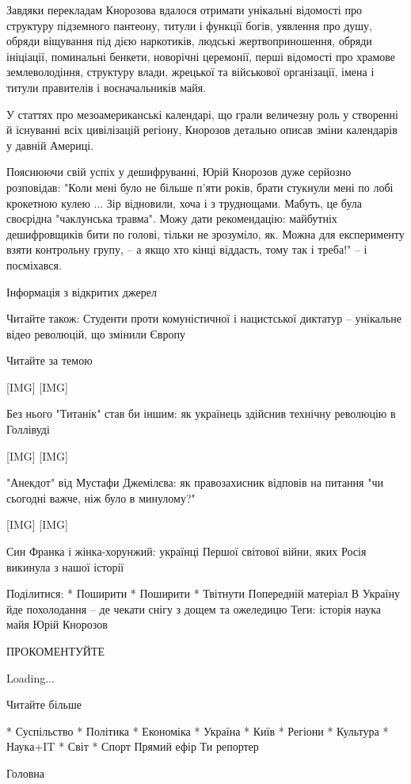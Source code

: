 Завдяки перекладам Кнорозова вдалося отримати унікальні відомості про
структуру підземного пантеону, титули і функції богів, уявлення про душу,
обряди віщування під дією наркотиків, людські жертвоприношення, обряди
ініціації, поминальні бенкети, новорічні церемонії, перші відомості про
храмове землеволодіння, структуру влади, жрецької та військової
організації, імена і титули правителів і воєначальників майя.

У статтях про мезоамериканські календарі, що грали величезну роль у
створенні й існуванні всіх цивілізацій регіону, Кнорозов детально описав
зміни календарів у давній Америці.

Пояснюючи свій успіх у дешифруванні, Юрій Кнорозов дуже серйозно
розповідав: "Коли мені було не більше п'яти років, брати стукнули мені
по лобі крокетною кулею ... Зір відновили, хоча і з труднощами. Мабуть,
це була своєрідна "чаклунська травма". Можу дати рекомендацію: майбутніх
дешифровщиків бити по голові, тільки не зрозуміло, як. Можна для
експерименту взяти контрольну групу, – а якщо хто кінці віддасть, тому
так і треба!" – і посміхався.

Інформація з відкритих джерел

Читайте також: Студенти проти комуністичної і нацистської диктатур –
унікальне відео революцій, що змінили Європу

Читайте за темою

[IMG] [IMG]

Без нього "Титанік" став би іншим: як українець здійснив технічну революцію в
Голлівуді

[IMG] [IMG]

"Анекдот" від Мустафи Джемілєва: як правозахисник відповів на питання "чи
сьогодні важче, ніж було в минулому?"

[IMG] [IMG]

Син Франка і жінка-хорунжий: українці Першої світової війни, яких Росія
викинула з нашої історії

Поділитися:
* Поширити
* Поширити
* Твітнути
Попередній матеріал
В Україну йде похолодання – де чекати снігу з дощем та ожеледицю
Теги:
історія наука майя Юрій Кнорозов

ПРОКОМЕНТУЙТЕ

Loading...

Читайте більше

* Суспільство
* Політика
* Економіка
* Україна
* Київ
* Регіони
* Культура
* Наука+IT
* Світ
* Спорт
Прямий ефір Ти репортер

Головна

